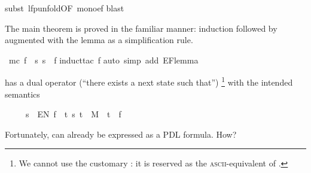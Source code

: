 \begin{isabellebody}
\begin{isamarkuptxt}
\end{isamarkuptxt}%
\isamarkuptrue%
\isamarkupfalse%
{}subst\ lfp{}unfold{}OF\ mono{}ef{}{}\isanewline
{}\isamarkupfalse%
{}blast{}\isanewline
{}\isamarkupfalse%
%
\endisatagproof
{\isafoldproof}%
%
\isadelimproof
%
\endisadelimproof
%
\begin{isamarkuptext}%
The main theorem is proved in the familiar manner: induction followed by
 augmented with the lemma as a simplification rule.%
\end{isamarkuptext}%
\isamarkuptrue%
\isamarkupfalse%
\ {}mc\ f\ {}\ {}s{}\ s\ {}\ f{}{}\isanewline
%
\isadelimproof
%
\endisadelimproof
%
\isatagproof
{}\isamarkupfalse%
{}induct{}tac\ f{}\isanewline
{}\isamarkupfalse%
{}auto\ simp\ add{}\ EF{}lemma{}\isanewline
{}\isamarkupfalse%
%
\endisatagproof
{\isafoldproof}%
%
\isadelimproof
%
\endisadelimproof
%
\begin{isamarkuptext}%
\begin{exercise}
 has a dual operator  
(``there exists a next state such that'')%
\footnote{We cannot use the customary : it is reserved
as the \textsc{ascii}-equivalent of .}
with the intended semantics
\begin{isabelle}%
\ \ \ \ \ s\ {}\ EN\ f\ {}\ {}{}t{}\ {}s{}\ t{}\ {}\ M\ {}\ t\ {}\ f{}%
\end{isabelle}
Fortunately,  can already be expressed as a PDL formula. How?


\end{exercise}
\end{isamarkuptext}
\end{isabellebody}
